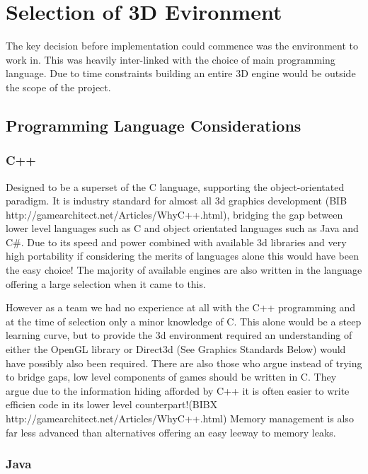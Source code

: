 

\section*{Selection of 3D Evironment}

The key decision before implementation could commence was the environment
to work in. This was heavily inter-linked with the choice of main
programming language. Due to time constraints building an entire 3D
engine would be outside the scope of the project.


\subsection*{Programming Language Considerations}


\subsubsection*{C++}

Designed to be a superset of the C language, supporting the object-orientated
paradigm. It is industry standard for almost all 3d graphics development
(BIB http://gamearchitect.net/Articles/WhyC++.html), bridging the
gap between lower level languages such as C and object orientated
languages such as Java and C\#. Due to its speed and power combined
with available 3d libraries and very high portability if considering
the merits of languages alone this would have been the easy choice!
The majority of available engines are also written in the language
offering a large selection when it came to this.

However as a team we had no experience at all with the C++ programming
and at the time of selection only a minor knowledge of C. This alone
would be a steep learning curve, but to provide the 3d environment
required an understanding of either the OpenGL library or Direct3d
(See Graphics Standards Below) would have possibly also been required.
There are also those who argue instead of trying to bridge gaps, low
level components of games should be written in C. They argue due to
the information hiding afforded by C++ it is often easier to write
efficien code in its lower level counterpart!(BIBX http://gamearchitect.net/Articles/WhyC++.html)
Memory management is also far less advanced than alternatives offering
an easy leeway to memory leaks.


\subsubsection*{Java}

